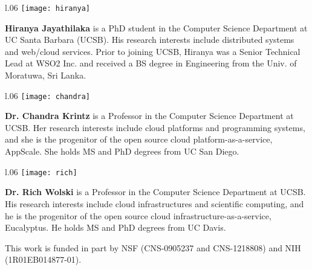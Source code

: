 \begin{wrapfigure}{l}{.06\textwidth} %
\centering
\texttt{[image: hiranya]}
\end{wrapfigure}
\noindent
\textbf{Hiranya Jayathilaka} is a PhD student 
in the Computer Science Department at 
UC Santa Barbara (UCSB).  
His research interests include distributed systems and web/cloud services.
Prior to joining UCSB, Hiranya
was a Senior Technical Lead at WSO2 Inc. and received a BS degree in 
Engineering from the Univ. of Moratuwa, Sri Lanka. 

\vspace{0.1in}

\begin{wrapfigure}{l}{.06\textwidth} %
\centering
\texttt{[image: chandra]}
\end{wrapfigure}
\noindent
\textbf{Dr. Chandra Krintz} is a Professor 
in the Computer Science Department at UCSB.
Her research interests include cloud platforms and programming systems, and
she is the progenitor of the open source cloud platform-as-a-service, AppScale.
She holds MS and PhD degrees
from UC San Diego.

\vspace{0.1in}

\begin{wrapfigure}{l}{.06\textwidth} %
\centering
\texttt{[image: rich]}
\end{wrapfigure}
\noindent
\textbf{Dr. Rich Wolski} is a Professor 
in the Computer Science Department at UCSB.
His research interests include cloud infrastructures and scientific computing,
and he is the progenitor of the open source cloud infrastructure-as-a-service, Eucalyptus.
He holds MS and PhD degrees from UC Davis.


\vspace{0.1in}
\noindent
This work is funded in part by NSF (CNS-0905237 and CNS-1218808) and NIH
(1R01EB014877-01).


